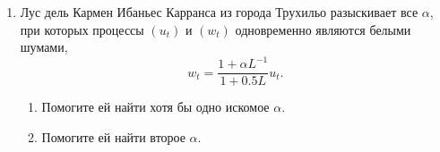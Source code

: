 \documentclass[12pt]{article}
\begin{document}
\begin{enumerate}
\item Лус дель Кармен Ибаньес Карранса из города Трухильо разыскивает все $\alpha$, при которых процессы $(u_t)$ и $(w_t)$ 
одновременно являются белыми шумами,
\[
w_t = \frac{1+\alpha L^{-1}}{1 + 0.5 L} u_t.
\]
\begin{enumerate}
\item Помогите ей найти хотя бы одно искомое $\alpha$.
\item Помогите ей найти второе $\alpha$. 
\end{enumerate}



\end{enumerate}
\end{document}
